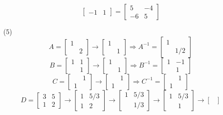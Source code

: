 \begin{itemize}
$$\begin{bmatrix}
-1 & 1
\end{bmatrix} = \begin{bmatrix}
5 & -4 \\
-6 & 5
\end{bmatrix}$$
\item[(5)]
$$A = \begin{bmatrix}
1 & \\
& 2
\end{bmatrix} \rightarrow \begin{bmatrix}
1 & \\
& 1
\end{bmatrix} \Rightarrow A^{-1} = \begin{bmatrix}
1 & \\
& 1/2
\end{bmatrix} $$
$$B = \begin{bmatrix}
1 & 1 \\
& 1
\end{bmatrix} \rightarrow \begin{bmatrix}
1 & \\
& 1
\end{bmatrix} \Rightarrow B^{-1} = \begin{bmatrix}
1 & -1 \\
& 1
\end{bmatrix}$$
$$C = \begin{bmatrix}
& 1 \\
1 &
\end{bmatrix} \rightarrow \begin{bmatrix}
& 1 \\
1 &
\end{bmatrix} \Rightarrow C^{-1} = \begin{bmatrix}
& 1 \\
1 &
\end{bmatrix}$$
$$D = \begin{bmatrix}
3 & 5 \\
1 & 2
\end{bmatrix} \rightarrow \begin{bmatrix}
1 & 5/3 \\
1 & 2
\end{bmatrix} \rightarrow \begin{bmatrix}
1 & 5/3 \\
& 1/3
\end{bmatrix} \rightarrow \begin{bmatrix}
1 & 5/3 \\
& 1
\end{bmatrix} \rightarrow \begin{bmatrix}

\end{bmatrix}$$
\end{itemize}
